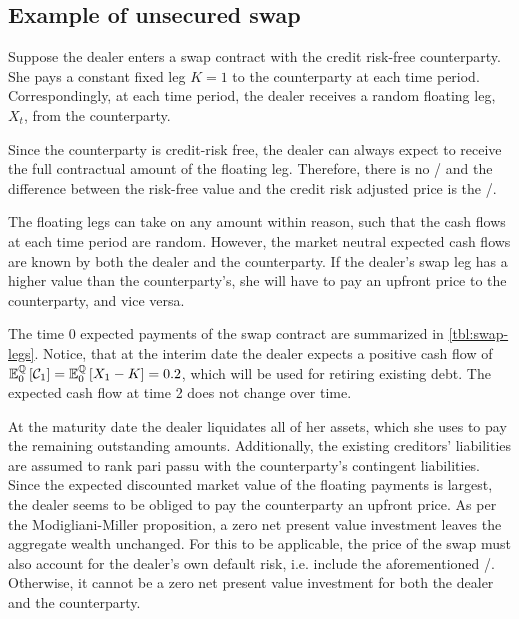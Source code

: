 \documentclass[main.tex]{subfiles}
\begin{document}
        \subsection{Example of unsecured swap}
            Suppose the dealer enters a swap contract with the credit risk-free counterparty.
            She pays a constant fixed leg $K=\num{1}$ to the counterparty at each time period.
            Correspondingly, at each time period,
            the dealer receives a random floating leg, $X_t$, from the counterparty.

            Since the counterparty is credit-risk free,
            the dealer can always expect to receive the full contractual amount of the floating leg.
            Therefore, there is no \CVA/ and
            the difference between the risk-free value and the credit risk adjusted price is the \DVA/.

            The floating legs can take on any amount within reason,
            such that the cash flows at each time period are random.
            However, the market neutral expected cash flows are known
            by both the dealer and the counterparty.
            If the dealer's swap leg has a higher value than the counterparty's,
            she will have to pay an upfront price to the counterparty,
            and vice versa.

            The time 0 expected payments of the swap contract are summarized in \cref{tbl:swap-legs}.
            Notice, that at the interim date the dealer expects a positive cash flow of
            $\mathbb{E}_{0}^{\mathbb{Q}}\left[\mathcal{C}_1\right] = \mathbb{E}_{0}^{\mathbb{Q}}\left[X_1 - K\right] = \num{0.2}$,
            which will be used for retiring existing debt.
            The expected cash flow at time 2 does not change over time.

            At the maturity date the dealer liquidates all of her assets,
            which she uses to pay the remaining outstanding amounts.
            Additionally, the existing creditors' liabilities are assumed to rank pari passu with the counterparty's contingent liabilities.
            \\
            Since the expected discounted market value of the floating payments is largest,
            the dealer seems to be obliged to pay the counterparty an upfront price.
            As per the Modigliani-Miller proposition, 
            a zero net present value investment leaves the aggregate wealth unchanged.
            For this to be applicable, the price of the swap must also account for the dealer's own default risk,
            i.e. include the aforementioned \DVA/.
            Otherwise, it cannot be a zero net present value investment for both the dealer and the counterparty.
            
\end{document}
